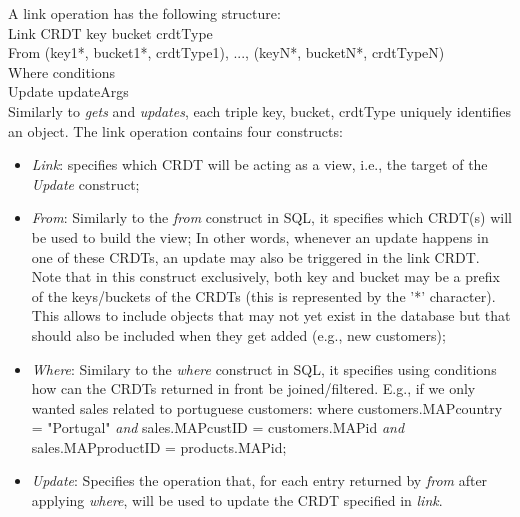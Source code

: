 \documentclass{vldb}
\begin{document}
A link operation has the following structure:
\\

Link CRDT key bucket crdtType \\
From (key1*, bucket1*, crdtType1), ..., (keyN*, bucketN*, crdtTypeN) \\
Where conditions \\
Update updateArgs \\


Similarly to \emph{gets} and \emph{updates}, each triple key, bucket, crdtType uniquely identifies an object.
The link operation contains four constructs:

\begin{itemize}
	\item \emph{Link}: specifies which CRDT will be acting as a view, i.e., the target of the \emph{Update} construct;
	\item \emph{From}: Similarly to the \emph{from} construct in SQL, it specifies which CRDT(s) will be used to build the view;
	In other words, whenever an update happens in one of these CRDTs, an update may also be triggered in the link CRDT.
	Note that in this construct exclusively, both key and bucket may be a prefix of the keys/buckets of the CRDTs (this is represented by the '*' character).
	This allows to include objects that may not yet exist in the database but that should also be included when they get added (e.g., new customers);
	\item \emph{Where}: Similary to the \emph{where} construct in SQL, it specifies using conditions how can the CRDTs returned in front be joined/filtered. E.g., if we only wanted sales related to portuguese customers: where customers.MAP{country} = "Portugal" \emph{and} sales.MAP{custID} = customers.MAP{id} \emph{and} sales.MAP{productID} = products.MAP{id};
	\item \emph{Update}: Specifies the operation that, for each entry returned by \emph{from} after applying \emph{where}, will be used to update the CRDT specified in \emph{link}.
\end{itemize}
\end{document}
